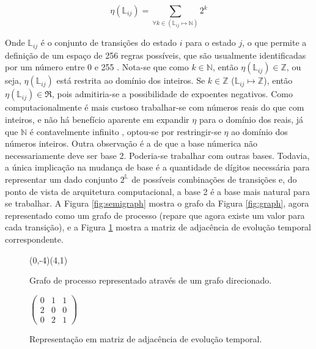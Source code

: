 \documentclass[12pt,a4paper]{article}
\let\vState=\origState
\begin{document}
\begin{equation}
\eta(\mathbb{L}_{ij}) = \sum_{\forall k \in (\mathbb{L}_{ij} \mapsto \mathbb{N})} 2^k
\end{equation}

Onde $\mathbb{L}_{ij}$ é o conjunto de transições do estado $i$ para o estado
$j$, o que permite a definição de um espaço de 256 regras possíveis, que são usualmente
identificadas por um número entre 0 e 255 .
Nota-se que como $k \in \mathbb{N}$, então $\eta(\mathbb{L}_{ij}) \in \mathbb{Z}$,
ou seja, $\eta(\mathbb{L}_{ij})$ está restrita ao domínio dos inteiros. Se
$k \in \mathbb{Z}$ ($\mathbb{L}_{ij} \mapsto \mathbb{Z}$), então
$\eta(\mathbb{L}_{ij}) \in \Re$, pois admitiria-se a possibilidade de expoentes negativos.
Como computacionalmente é mais custoso trabalhar-se com números reais do que com inteiros,
e não há benefício aparente em expandir $\eta$ para o domínio dos reais,
já que $\mathbb{N}$ é contavelmente infinito , optou-se
por restringir-se $\eta$ ao domínio dos números inteiros. Outra observação
é a de que a base númerica não necessariamente deve ser base 2. Poderia-se trabalhar com outras
bases. Todavia, a única implicação na mudança de base é a quantidade de dígitos
necessária para representar um dado conjunto $2^{\mathbb{L}}$ de possíveis combinações de
transições e, do ponto de vista de arquitetura computacional, a base 2 é a
base mais natural para se trabalhar. A Figura \ref{fig:semigraph}
mostra o grafo da Figura \ref{fig:graph}, agora representado como um grafo de processo
(repare que agora existe um valor para cada transição), e a Figura \ref{fig:iadjm}
mostra a matriz de adjacência de evolução temporal correspondente.

\begin{figure}[ht]
\begin{minipage}[b]{0.5\linewidth}
\begin{center}
\begin{VCPicture}{(0,-4)(4,1)}
\vState[1]{(0,0)}{A} \vState[2]{(4,0)}{B}
\vState[3]{(2,-2)}{C}
  
 
\end{VCPicture}
\caption{Grafo de processo representado através de um grafo direcionado.}
\label{fig:semigraph}
\end{center}
\end{minipage}
\hspace{0.5cm}
\begin{minipage}[b]{0.5\linewidth}
\begin{center}
\begin{math}
\begin{pmatrix}
0 & 1 & 1 \\
2 & 0 & 0 \\
0 & 2 & 1
\end{pmatrix}
\end{math}
\caption{Representação em matriz de adjacência de evolução temporal.}
\label{fig:iadjm}
\end{center}
\end{minipage}
\end{figure}
\end{document}
